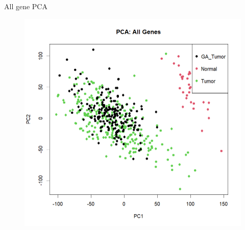 \documentclass[12pt, aspectratio=43]{beamer}
\begin{document}
	
	\begin{frame}{All gene PCA}
		\begin{figure}[h!]
			\centering
			\includegraphics[width=0.8\linewidth]{allgene.png}
		\end{figure}
	\end{frame}
	
\end{document}
